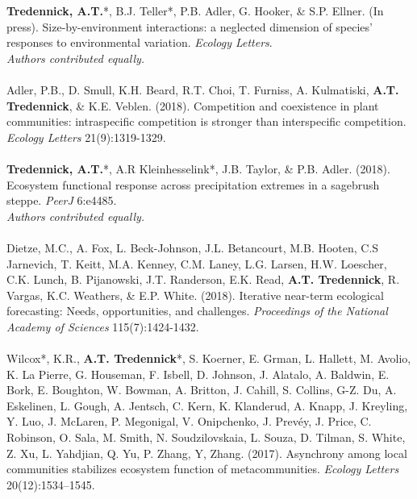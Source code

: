 

\begin{pubentries}
\begin{\small}
{\bf{Tredennick, A.T.}}*, B.J. Teller*, P.B. Adler, G. Hooker, \& S.P. Ellner. (In press). Size-by-environment interactions: a neglected dimension of species’ responses to environmental variation. \emph{Ecology Letters}.\\
{\footnotesize*{\emph{Authors contributed equally.}}}\\
\\
Adler, P.B., D. Smull, K.H. Beard, R.T. Choi, T. Furniss, A. Kulmatiski, {\bf{A.T. Tredennick}}, \& K.E. Veblen. (2018). Competition and coexistence in plant communities: intraspecific competition is stronger than interspecific competition. \emph{Ecology Letters} 21(9):1319-1329.\\
\\
{\bf{Tredennick, A.T.}}*, A.R Kleinhesselink*, J.B. Taylor, \& P.B. Adler. (2018). Ecosystem functional response across precipitation extremes in a sagebrush steppe. \emph{PeerJ} 6:e4485.\\
{\footnotesize*{\emph{Authors contributed equally.}}}\\
\\
Dietze, M.C., A. Fox, L. Beck-Johnson, J.L. Betancourt, M.B. Hooten, C.S Jarnevich, T. Keitt, M.A. Kenney, C.M. Laney, L.G. Larsen, H.W. Loescher, C.K. Lunch, B. Pijanowski, J.T. Randerson, E.K. Read, {\bf{A.T. Tredennick}}, R. Vargas, K.C. Weathers, \& E.P. White. (2018). Iterative near-term ecological forecasting: Needs, opportunities, and challenges. \emph{Proceedings of the National Academy of Sciences} 115(7):1424-1432.\\
\\
Wilcox*, K.R., {\bf{A.T. Tredennick}}*, S. Koerner, E. Grman, L. Hallett, M. Avolio, K. La Pierre, G. Houseman, F. Isbell, D. Johnson, J. Alatalo, A. Baldwin, E. Bork, E. Boughton, W. Bowman, A. Britton, J. Cahill, S. Collins, G-Z. Du, A. Eskelinen, L. Gough, A. Jentsch, C. Kern, K. Klanderud, A. Knapp, J. Kreyling, Y. Luo, J. McLaren, P. Megonigal, V. Onipchenko, J. Prevéy, J. Price, C. Robinson, O. Sala, M. Smith, N. Soudzilovskaia, L. Souza, D. Tilman, S. White, Z. Xu, L. Yahdjian, Q. Yu, P. Zhang, Y, Zhang. (2017). Asynchrony among local communities stabilizes ecosystem function of metacommunities. \emph{Ecology Letters} 20(12):1534–1545.\\

\end{\small}
\end{pubentries}
